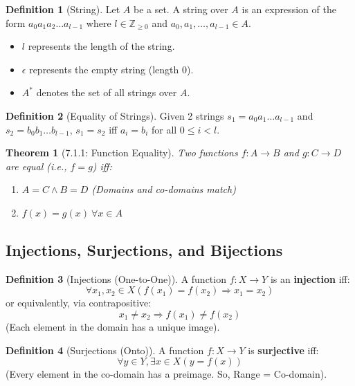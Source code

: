\documentclass{article}
\theoremstyle{plain}
\newtheorem{theorem}{Theorem}[section]
\theoremstyle{definition}
\newtheorem*{definition}{Definition}
\theoremstyle{remark}
\begin{document}
\begin{definition}[String]
    Let $A$ be a set. A string over $A$ is an expression of the form $a_0 a_1 a_2 \dots a_{l-1}$ where $l \in \mathbb{Z}_{\geq 0}$ and $a_0, a_1, \dots, a_{l-1} \in A$.
    \begin{itemize}
        \item $l$ represents the length of the string.
        \item $\epsilon$ represents the empty string (length 0).
        \item $A^*$ denotes the set of all strings over $A$.
    \end{itemize}
\end{definition}

\begin{definition}[Equality of Strings]
    Given 2 strings $s_1 = a_0 a_1 \dots a_{l-1}$ and $s_2 = b_0 b_1 \dots b_{l-1}$, $s_1 = s_2$ iff $a_i = b_i$ for all $0 \leq i < l$.
\end{definition}

\begin{theorem}[7.1.1: Function Equality]
    Two functions $f: A \rightarrow B$ and $g: C \rightarrow D$ are equal (i.e., $f=g$) iff:
    \begin{enumerate}
        \item $A = C \wedge B = D$ (Domains and co-domains match)
        \item $f(x) = g(x) \ \forall x \in A$
    \end{enumerate}
\end{theorem}

\subsection{Injections, Surjections, and Bijections}

\begin{definition}[Injections (One-to-One)]
    A function $f: X \rightarrow Y$ is an \textbf{injection} iff:
    \[ \forall x_1, x_2 \in X (f(x_1) = f(x_2) \Rightarrow x_1 = x_2) \]
    or equivalently, via contrapositive:
    \[ x_1 \neq x_2 \Rightarrow f(x_1) \neq f(x_2) \]
    (Each element in the domain has a unique image).
\end{definition}

\begin{definition}[Surjections (Onto)]
    A function $f: X \rightarrow Y$ is \textbf{surjective} iff:
    \[ \forall y \in Y, \exists x \in X (y = f(x)) \]
    (Every element in the co-domain has a preimage. So, Range = Co-domain).
\end{definition}
\end{document}
